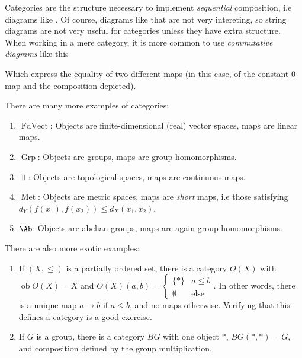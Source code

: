 \documentclass{article}
\DeclareMathOperator{\ob}{ob}
\DeclareMathOperator{\Grp}{Grp}
\DeclareMathOperator{\Met}{Met}
\DeclareMathOperator{\FdVect}{FdVect}
\begin{document}
Categories are the structure necessary to implement \emph{sequential} composition, i.e diagrams like .
Of course, diagrams like that are not very intereting, so string diagrams are not very useful for categories unless they have extra structure.
When working in a mere category, it is more common to use \emph{commutative diagrams} like this


Which express the equality of two different maps (in this case, of the constant $0$ map and the composition depicted).

\begin{example}
    There are many more examples of categories:
    \begin{enumerate}
        \item $\FdVect$: Objects are finite-dimensional (real) vector spaces, maps are linear maps.
        \item $\Grp$: Objects are groups, maps are group homomorphisms.
        \item $\Top$: Objects are topological spaces, maps are continuous maps.
        \item $\Met$: Objects are metric spaces, maps are \emph{short} maps, i.e those satisfying $d_Y(f(x_1),f(x_2)) \leq d_X(x_1,x_2)$.
        \item $\Ab$: Objects are abelian groups, maps are again group homomorphisms.
    \end{enumerate}
    There are also more exotic examples:
    \begin{enumerate}
    \item If $(X,\leq)$ is a partially ordered set, there is a category $O(X)$ with $\ob O(X) = X$ and $O(X)(a,b) = \begin{cases} \{*\} & a \leq b\\\emptyset & \text{else}\end{cases}$.
    In other words, there is a unique map $a \to b$ if $a \leq b$, and no maps otherwise. Verifying that this defines a category is a good exercise.
    \item If $G$ is a group, there is a category $BG$ with one object $*$, $BG(*,*) = G$, and composition defined by the group multiplication.
    \end{enumerate}
\end{example}
\end{document}
